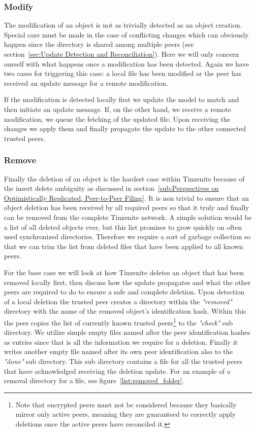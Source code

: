 \subsubsection{Modify}
\label{subs:Modify}

The modification of an object is not as trivially detected as an object creation.
Special care must be made in the case of conflicting changes which can obviously happen since the directory is shared among multiple peers (see section~\ref{sec:Update Detection and Reconciliation}).
Here we will only concern ourself with what happens once a modification has been detected.
Again we have two cases for triggering this case: a local file has been modified or the peer has received an update message for a remote modification.

If the modification is detected locally first we update the model to match and then initiate an update message.
If, on the other hand, we receive a remote modification, we queue the fetching of the updated file.
Upon receiving the changes we apply them and finally propagate the update to the other connected trusted peers.

\subsubsection{Remove}
\label{subs:Remove}

Finally the deletion of an object is the hardest case within Tinzenite because of the insert delete ambiguity as discussed in section~\ref{sub:Perspectives on Optimistically Replicated, Peer-to-Peer Filing}.
It is non trivial to ensure that an object deletion has been received by all required peers so that it truly and finally can be removed from the complete Tinzenite network.
A simple solution would be a list of all deleted objects ever, but this list promises to grow quickly on often used synchronized directories.
Therefore we require a sort of garbage collection so that we can trim the list from deleted files that have been applied to all known peers.

For the base case we will look at how Tinzenite deletes an object that has been removed locally first, then discuss how the update propagates and what the other peers are required to do to ensure a safe and complete deletion.
Upon detection of a local deletion the trusted peer creates a directory within the \textit{"removed"} directory with the name of the removed object's identification hash.
Within this the peer copies the list of currently known trusted peers\footnote{Note that encrypted peers must not be considered because they basically mirror only active peers, meaning they are guaranteed to correctly apply deletions once the active peers have reconciled it.} to the \textit{"check"} sub directory.
We utilize simple empty files named after the peer identification hashes as entries since that is all the information we require for a deletion.
Finally it writes another empty file named after its own peer identification also to the \textit{"done"} sub directory.
This sub directory contains a file for all the trusted peers that have acknowledged receiving the deletion update.
For an example of a removal directory for a file, see figure~\ref{list:removed_folder}.

